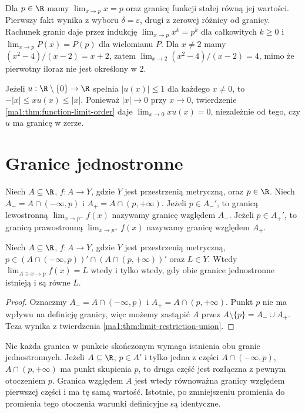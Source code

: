 \begin{przyklad}
\label{ma1:ex:limit-polynomial-rational}
Dla $p\in\R$ mamy $\lim_{x\to p}x=p$ oraz granicę funkcji stałej równą jej wartości. Pierwszy fakt wynika z wyboru $\delta=\varepsilon$, drugi z zerowej różnicy od granicy. Rachunek granic daje przez indukcję $\lim_{x\to p}x^k=p^k$ dla całkowitych $k\ge0$ i $\lim_{x\to p}P(x)=P(p)$ dla wielomianu $P$. Dla $x\ne2$ mamy $(x^2-4)/(x-2)=x+2$, zatem $\lim_{x\to2}(x^2-4)/(x-2)=4$, mimo że pierwotny iloraz nie jest określony w $2$.
\end{przyklad}
\begin{przyklad}
\label{ma1:ex:limit-squeeze}
Jeżeli $u:\R\setminus\{0\}\to\R$ spełnia $|u(x)|\le1$ dla każdego $x\ne0$, to $-|x|\le xu(x)\le |x|$. Ponieważ $|x|\to0$ przy $x\to0$, twierdzenie \ref{ma1:thm:function-limit-order} daje $\lim_{x\to0}xu(x)=0$, niezależnie od tego, czy $u$ ma granicę w zerze.
\end{przyklad}

\section{Granice jednostronne}
\begin{definicja}
\label{ma1:def:one-sided-limits}
Niech $A\subseteq\R$, $f:A\to Y$, gdzie $Y$ jest przestrzenią metryczną, oraz $p\in\R$. Niech $A_-=A\cap(-\infty,p)$ i $A_+=A\cap(p,+\infty)$. Jeżeli $p\in A_-'$, to granicą lewostronną $\lim_{x\to p^-}f(x)$ nazywamy granicę względem $A_-$. Jeżeli $p\in A_+'$, to granicą prawostronną $\lim_{x\to p^+}f(x)$ nazywamy granicę względem $A_+$.
\end{definicja}
\begin{twierdzenie}
\label{ma1:thm:one-sided-limit-equivalence}
Niech $A\subseteq\R$, $f:A\to Y$, gdzie $Y$ jest przestrzenią metryczną, $p\in (A\cap(-\infty,p))'\cap(A\cap(p,+\infty))'$ oraz $L\in Y$. Wtedy $\lim_{A\ni x\to p}f(x)=L$ wtedy i tylko wtedy, gdy obie granice jednostronne istnieją i są równe $L$.
\end{twierdzenie}
\begin{proof}
Oznaczmy $A_-=A\cap(-\infty,p)$ i $A_+=A\cap(p,+\infty)$. Punkt $p$ nie ma wpływu na definicję granicy, więc możemy zastąpić $A$ przez $A\setminus\{p\}=A_-\cup A_+$. Teza wynika z twierdzenia \ref{ma1:thm:limit-restriction-union}.
\end{proof}
\begin{uwaga}
\label{ma1:rem:one-sided-accumulation}
Nie każda granica w punkcie skończonym wymaga istnienia obu granic jednostronnych. Jeżeli $A\subseteq\R$, $p\in A'$ i tylko jedna z części $A\cap(-\infty,p)$, $A\cap(p,+\infty)$ ma punkt skupienia $p$, to druga część jest rozłączna z pewnym otoczeniem $p$. Granica względem $A$ jest wtedy równoważna granicy względem pierwszej części i ma tę samą wartość. Istotnie, po zmniejszeniu promienia do promienia tego otoczenia warunki definicyjne są identyczne.
\end{uwaga}

